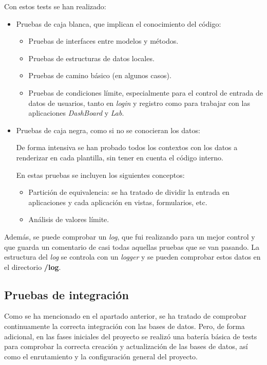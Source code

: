 Con estos tests se han realizado:

\begin{itemize}
\item
Pruebas de caja blanca, que implican el conocimiento del código:
\begin{itemize}
\item 
Pruebas de interfaces entre modelos y métodos.
\item
Pruebas de estructuras de datos locales. 
\item
Pruebas de camino básico (en algunos casos).
\item
Pruebas de condiciones límite, especialmente para el control de entrada de datos de usuarios, tanto en \emph{login} y registro como para trabajar con las aplicaciones \emph{DashBoard} y \emph{Lab}. 
\end{itemize}

\item
Pruebas de caja negra, como si no se conocieran los datos:

De forma intensiva se han probado todos los contextos con los datos a renderizar en cada plantilla, sin tener en cuenta el código interno.

En estas pruebas se incluyen los siguientes conceptos:

\begin{itemize}
\item 
Partición de equivalencia: se ha tratado de dividir la entrada en aplicaciones y cada aplicación en vistas, formularios, etc. 
\item
Análisis de valores límite. 
\end{itemize}
\end{itemize}

Además, se puede comprobar un \emph{log}, que fui realizando para un mejor control y que guarda un comentario de casi todas aquellas pruebas que se van pasando. La estructura del \emph{log} se controla con un \emph{logger} y se pueden comprobar estos datos en el directorio \textbf{/log}.



\subsection{Pruebas de integración}

Como se ha mencionado en el apartado anterior, se ha tratado de comprobar continuamente la correcta integración con las bases de datos. Pero, de forma adicional, en las fases iniciales del proyecto se realizó una batería básica de tests para comprobar la correcta creación y actualización de las bases de datos, así como el enrutamiento y la configuración general del proyecto.

